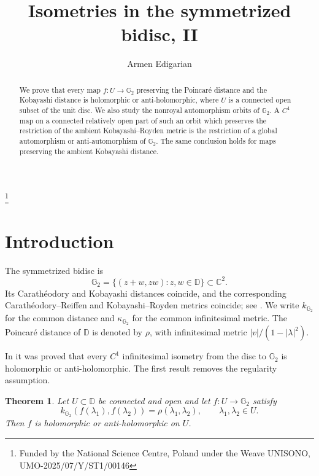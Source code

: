 \documentclass[12pt]{amsart}
\newcommand{\DD}{\mathbb D}
\newcommand{\CC}{\mathbb C}
\newcommand{\GG}{\mathbb G_2}
\newtheorem{theorem}{Theorem}
\begin{document}
\title{Isometries in the symmetrized bidisc, II}
\author{Armen Edigarian}
\address{Faculty of Mathematics and Computer Science, Jagiellonian University, ul. \L ojasiewicza 6, 30-348 Krak\'ow, Poland}
\thanks{Funded by the National Science Centre, Poland under the Weave UNISONO, UMO-2025/07/Y/ST1/00146}

\begin{abstract}
We prove that every map $f:U\to\GG$ preserving the Poincar\'e distance and the Kobayashi distance is
holomorphic or anti-holomorphic, 
where $U$ is a connected open subset of the unit disc. 
We also study the nonroyal automorphism orbits of $\GG$. A $C^1$ map on a connected relatively open part of such an orbit which preserves the restriction of the
ambient Kobayashi--Royden metric is the restriction of a global automorphism or
anti-automorphism of $\GG$.  The same conclusion holds for maps preserving the
ambient Kobayashi distance.
\end{abstract}

\maketitle

\section{Introduction}

The symmetrized bidisc is
\[
 \GG=\{(z+w,zw):z,w\in\DD\}\subset\CC^2.
\]
Its Carath\'eodory and Kobayashi distances coincide, and the corresponding
Carath\'eodory--Reiffen and Kobayashi--Royden metrics coincide; see
\cite{AglerYoung2004,Costara2004}.  We write $k_{\GG}$ for the common distance
and $\kappa_{\GG}$ for the common infinitesimal metric.  The Poincar\'e distance
of $\DD$ is denoted by $\rho$, with infinitesimal metric
$|v|/(1-|\lambda|^2)$.

In \cite{Edigarian2024} it was proved that every $C^1$ infinitesimal isometry
from the disc to $\GG$ is holomorphic or anti-holomorphic.  The first result removes the regularity assumption.
\begin{theorem}\label{thm:disc}
Let $U\subset\DD$ be connected and open and let $f:U\to\GG$ satisfy
\[
 k_{\GG}(f(\lambda_1),f(\lambda_2))=\rho(\lambda_1,\lambda_2),\qquad \lambda_1,\lambda_2\in U.
\]
Then $f$ is holomorphic or anti-holomorphic on $U$.
\end{theorem}
\end{document}
